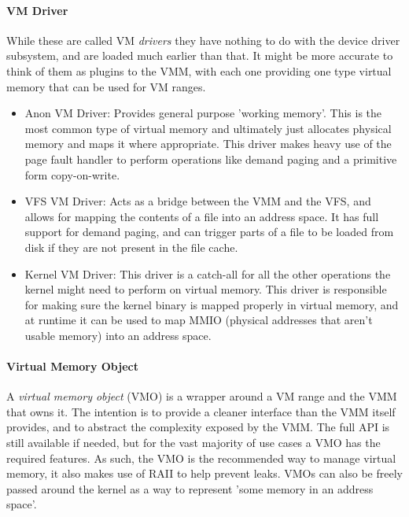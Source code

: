 \paragraph{VM Driver} 
\label{vmdrivers}
While these are called VM \textit{drivers} they have nothing to do with the device driver subsystem, and are loaded much earlier than that. It might be more accurate to think of them as plugins to the VMM, with each one providing one type virtual memory that can be used for VM ranges.

\begin{itemize}
    \item Anon VM Driver: Provides general purpose 'working memory'. This is the most common type of virtual memory and ultimately just allocates physical memory and maps it where appropriate. This driver makes heavy use of the page fault handler to perform operations like demand paging and a primitive form copy-on-write.
    \item VFS VM Driver: Acts as a bridge between the VMM and the VFS, and allows for mapping the contents of a file into an address space. It has full support for demand paging, and can trigger parts of a file to be loaded from disk if they are not present in the file cache.
    \item Kernel VM Driver: This driver is a catch-all for all the other operations the kernel might need to perform on virtual memory. This driver is responsible for making sure the kernel binary is mapped properly in virtual memory, and at runtime it can be used to map MMIO (physical addresses that aren't usable memory) into an address space.
\end{itemize}

\paragraph{Virtual Memory Object}
A \textit{virtual memory object} (VMO) is a wrapper around a VM range and the VMM that owns it. The intention is to provide a cleaner interface than the VMM itself provides, and to abstract the complexity exposed by the VMM. The full API is still available if needed, but for the vast majority of use cases a VMO has the required features. As such, the VMO is the recommended way to manage virtual memory, it also makes use of RAII to help prevent leaks. VMOs can also be freely passed around the kernel as a way to represent 'some memory in an address space'.

